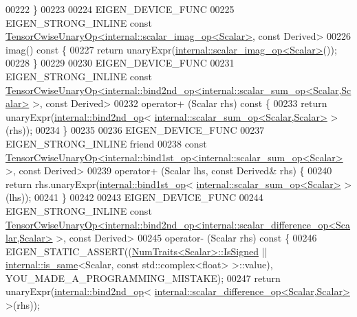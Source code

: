 \begin{DoxyCode}
00222     \}
00223 
00224     EIGEN\_DEVICE\_FUNC
00225     EIGEN\_STRONG\_INLINE \textcolor{keyword}{const} 
      \hyperlink{class_eigen_1_1_tensor_cwise_unary_op}{TensorCwiseUnaryOp<internal::scalar\_imag\_op<Scalar>}, \textcolor{keyword}{
      const} Derived>
00226     imag()\textcolor{keyword}{ const }\{
00227       \textcolor{keywordflow}{return} unaryExpr(\hyperlink{struct_eigen_1_1internal_1_1scalar__imag__op}{internal::scalar\_imag\_op<Scalar>}());
00228     \}
00229 
00230     EIGEN\_DEVICE\_FUNC
00231     EIGEN\_STRONG\_INLINE \textcolor{keyword}{const} 
      \hyperlink{class_eigen_1_1_tensor_cwise_unary_op}{TensorCwiseUnaryOp<internal::bind2nd\_op<internal::scalar\_sum\_op<Scalar,Scalar>}
       >, \textcolor{keyword}{const} Derived>
00232     operator+ (Scalar rhs)\textcolor{keyword}{ const }\{
00233       \textcolor{keywordflow}{return} unaryExpr(\hyperlink{struct_eigen_1_1internal_1_1bind2nd__op}{internal::bind2nd\_op}<
      \hyperlink{struct_eigen_1_1internal_1_1scalar__sum__op}{internal::scalar\_sum\_op<Scalar,Scalar>} >(rhs));
00234     \}
00235 
00236     EIGEN\_DEVICE\_FUNC
00237     EIGEN\_STRONG\_INLINE \textcolor{keyword}{friend}
00238     \textcolor{keyword}{const} 
      \hyperlink{class_eigen_1_1_tensor_cwise_unary_op}{TensorCwiseUnaryOp<internal::bind1st\_op<internal::scalar\_sum\_op<Scalar>}
       >, \textcolor{keyword}{const} Derived>
00239     operator+ (Scalar lhs, \textcolor{keyword}{const} Derived& rhs) \{
00240       \textcolor{keywordflow}{return} rhs.unaryExpr(\hyperlink{struct_eigen_1_1internal_1_1bind1st__op}{internal::bind1st\_op}<
      \hyperlink{struct_eigen_1_1internal_1_1scalar__sum__op}{internal::scalar\_sum\_op<Scalar>} >(lhs));
00241     \}
00242 
00243     EIGEN\_DEVICE\_FUNC
00244     EIGEN\_STRONG\_INLINE \textcolor{keyword}{const} 
      \hyperlink{class_eigen_1_1_tensor_cwise_unary_op}{TensorCwiseUnaryOp<internal::bind2nd\_op<internal::scalar\_difference\_op<Scalar,Scalar>}
       >, \textcolor{keyword}{const} Derived>
00245     operator- (Scalar rhs)\textcolor{keyword}{ const }\{
00246       EIGEN\_STATIC\_ASSERT((\hyperlink{group___core___module_struct_eigen_1_1_num_traits}{NumTraits<Scalar>::IsSigned} || 
      \hyperlink{struct_eigen_1_1internal_1_1is__same}{internal::is\_same}<Scalar, \textcolor{keyword}{const} std::complex<float> >::value), 
      YOU\_MADE\_A\_PROGRAMMING\_MISTAKE);
00247       \textcolor{keywordflow}{return} unaryExpr(\hyperlink{struct_eigen_1_1internal_1_1bind2nd__op}{internal::bind2nd\_op}<
      \hyperlink{struct_eigen_1_1internal_1_1scalar__difference__op}{internal::scalar\_difference\_op<Scalar,Scalar>} >(rhs));

\end{DoxyCode}
